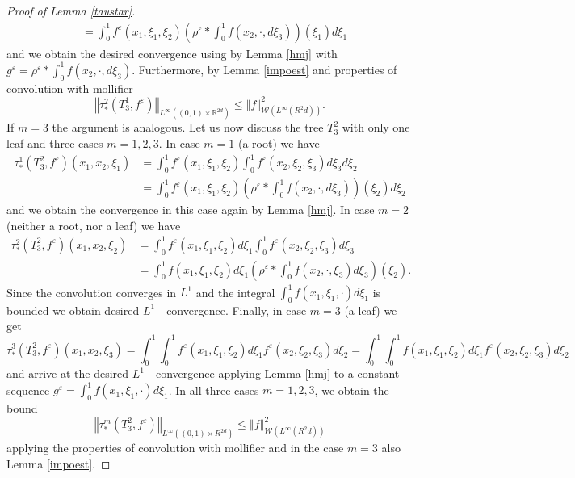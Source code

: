 \documentclass[10pt]{article}
\newcommand*{\norm}[1]{\left\Vert{#1}\right\Vert}
\newcommand{\ve}{\varepsilon}
\newcommand{\R}{\mathbb{R}}
\newcommand{\izj}{\int_{0}^{1}}
\newcommand{\W}{\mathcal{W}}
\begin{document}
\begin{proof}[Proof of Lemma \ref{taustar}]
\begin{align*}
&= \izj f^\ve(x_1,\xi_1,\xi_2)\left(\rho^{\ve}* \izj f(x_2,\cdot,d\xi_3)\right)(\xi_1)d
\xi_1
\end{align*}
and we obtain the desired convergence using by Lemma \ref{hmj} with $g^{\ve}=\rho^{\ve}* \izj f(x_2,\cdot,d\xi_3)$. Furthermore, by Lemma \ref{impoest} and properties of convolution with mollifier 
\[
\norm{\tau^2_{*}(T^1_3,f^{\ve})}_{L^{\infty}((0,1)\times \R^{2d})} \leq \norm{f}^2_{\W(L^{\infty}(R^2d))}.
\]
If $m=3$ the argument is analogous.
Let us now discuss the tree $T^2_3$ with only one leaf  and three cases $m=1,2,3$. In case $m=1$ (a root) we have
\begin{align*}
\tau^1_{*}(T_3^2,f^{\ve})(x_1,x_2,\xi_1) &=  \izj f^\ve(x_1,\xi_1,\xi_2) \izj f^{\ve}(x_2,\xi_2,\xi_3)d\xi_3 d\xi_2
\\
&= \izj f^\ve(x_1,\xi_1,\xi_2)\left(\rho^{\ve}* \izj f(x_2,\cdot,d\xi_3)\right)(\xi_2)d
\xi_2
\end{align*}
and we obtain the convergence in this case again by Lemma \ref{hmj}.
In case $m=2$ (neither a root, nor a leaf) we have
\begin{align*}
\tau^2_{*}(T_3^2,f^{\ve})(x_1,x_2,\xi_2) &=  \izj f^\ve(x_1,\xi_1,\xi_2) d\xi_1 \izj f^{\ve}(x_2,\xi_2,\xi_3)d\xi_3 \\
&=\izj f(x_1,\xi_1,\xi_2) d\xi_1 \left(\rho^{\ve} *\izj f(x_2,\cdot,\xi_3)d\xi_3\right)(\xi_2).
\end{align*}
Since the convolution converges in $L^1$ and the integral $\izj f(x_1,\xi_1,\cdot) d\xi_1$ is bounded we obtain desired $L^1$ - convergence.
Finally, in case $m=3$ (a leaf) we get
\[
\tau^3_{*}(T_3^2,f^{\ve})(x_1,x_2,\xi_3) =  \izj\izj f^\ve(x_1,\xi_1,\xi_2) d\xi_1  f^{\ve}(x_2,\xi_2,\xi_3)d\xi_2 =\izj \izj f(x_1,\xi_1,\xi_2) d\xi_1 f^{\ve}(x_2,\xi_2,\xi_3)d\xi_2 
\]
and arrive at the desired $L^1$ - convergence applying Lemma \ref{hmj} to a constant sequence $g^\ve = \izj f(x_1,\xi_1,\cdot) d\xi_1$.
In all three cases $m=1,2,3$, we obtain the bound 
\[
\norm{\tau^m_{*}(T^2_3,f^{\ve})}_{L^{\infty}((0,1)\times R^{2d})} \leq \norm{f}^2_{\W(L^{\infty}(R^2d))}
\]
applying the properties of convolution with mollifier and in the case $m=3$ also Lemma \ref{impoest}.


\end{proof}
\end{document}
